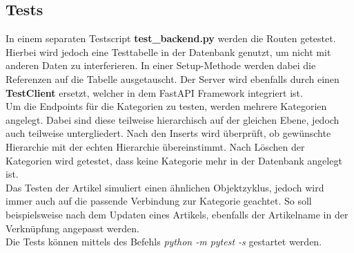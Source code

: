 \subsection{Tests}
In einem separaten Testscript \textbf{test\_backend.py} werden die Routen getestet. 
Hierbei wird jedoch eine Testtabelle in der Datenbank genutzt, um nicht mit anderen Daten zu interferieren. 
In einer Setup-Methode werden dabei die Referenzen auf die Tabelle ausgetauscht. 
Der Server wird ebenfalls durch einen \textbf{TestClient} ersetzt, welcher in dem FastAPI Framework integriert ist.\\
Um die Endpoints für die Kategorien zu testen, werden mehrere Kategorien angelegt.
Dabei sind diese teilweise hierarchisch auf der gleichen Ebene, jedoch auch teilweise untergliedert. 
Nach den Inserts wird überprüft, ob gewünschte Hierarchie mit der echten Hierarchie übereinstimmt.
Nach Löschen der Kategorien wird getestet, dass keine Kategorie mehr in der Datenbank angelegt ist. \\
Das Testen der Artikel simuliert einen ähnlichen Objektzyklus, jedoch wird immer auch auf die passende Verbindung zur Kategorie geachtet.
So soll beispielsweise nach dem Updaten eines Artikels, ebenfalls der Artikelname in der Verknüpfung angepasst werden.\\
Die Tests können mittels des Befehls \textit{python -m pytest -s} gestartet werden.

